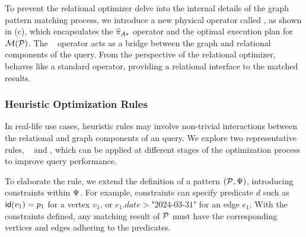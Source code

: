 To prevent the relational optimizer delve into the internal details of the graph pattern matching process, we introduce a new physical operator called \scangraphtable, as shown in (c), which encapsulates the $\widehat{\pi}_{A*}$ operator and the optimal execution plan for $\mathcal{M}(\mathcal{P})$.
The \scangraphtable~ operator acts as a bridge between the graph and relational components of the query. From the perspective of the relational optimizer, \scangraphtable~ behaves like a standard \scan operator, providing a relational interface to the matched results. %

\subsubsection{Heuristic Optimization Rules}
In real-life use cases, heuristic rules may involve non-trivial interactions between the relational and graph components of an \spjm query. We explore two representative rules, \filterrule~ and \joinfuserule, which can be applied at different stages of the optimization process to improve query performance.

 To elaborate the rule, we extend the definition of a pattern $(\mathcal{P}, \Psi)$, introducing constraints within $\Psi$. For example, constraints can specify predicate $d$ such as ${\mathsf{id}}(v_1) = p_1$ for a vertex $v_1$, or $e_1.date > \text{"2024-03-31"}$ for an edge $e_1$. With the constraints defined, any matching result of $\mathcal{P}$ must have the corresponding vertices and edges adhering to the predicates.

